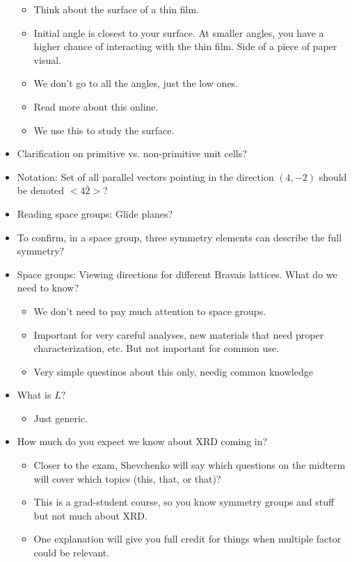 \documentclass[../notes.tex]{subfiles}
\begin{document}
\begin{itemize}
\begin{itemize}
        \item Think about the surface of a thin film.
        \item Initial angle is closest to your surface. At smaller angles, you have a higher chance of interacting with the thin film. Side of a piece of paper visual.
        \item We don't go to all the angles, just the low ones.
        \item Read more about this online.
        \item We use this to study the surface.
    \end{itemize}
    \item Clarification on primitive vs. non-primitive unit cells?
    \item Notation: Set of all parallel vectors pointing in the direction $(4,-2)$ should be denoted $<4\bar{2}>$?
    \item Reading space groups: Glide planes?
    \item To confirm, in a space group, three symmetry elements can describe the full symmetry?
    \item Space groups: Viewing directions for different Bravais lattices. What do we need to know?
    \begin{itemize}
        \item We don't need to pay much attention to space groups.
        \item Important for very careful analyses, new materials that need proper characterization, etc. But not important for common use.
        \item Very simple questinos about this only, needig common knowledge
    \end{itemize}
    \item What is $L$?
    \begin{itemize}
        \item Just generic.
    \end{itemize}
    \item How much do you expect we know about XRD coming in?
    \begin{itemize}
        \item Closer to the exam, Shevchenko will say which questions on the midterm will cover which topics (this, that, or that)?
        \item This is a grad-student course, so you know symmetry groups and stuff but not much about XRD.
        \item One explanation will give you full credit for things when multiple factor could be relevant.

\end{itemize}
\end{itemize}
\end{document}
